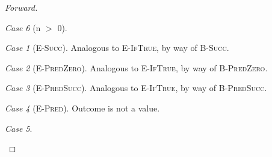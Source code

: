 \documentclass{article}
\theoremstyle{remark}
\newtheorem*{case}{Case}
\begin{document}
\begin{proof}[Forward]
\begin{case}[n $>$ 0]
            \begin{case}[\textsc{E-Succ}]
                Analogous to \textsc{E-IfTrue}, by way of \textsc{B-Succ}.
            \end{case}

            \begin{case}[\textsc{E-PredZero}]
                Analogous to \textsc{E-IfTrue}, by way of \textsc{B-PredZero}.
            \end{case}

            \begin{case}[\textsc{E-PredSucc}]
                Analogous to \textsc{E-IfTrue}, by way of \textsc{B-PredSucc}.
            \end{case}

            \begin{case}[\textsc{E-Pred}]
                Outcome is not a value.
            \end{case}

            \begin{case}

            \end{case}
        \end{case}


    \end{proof}
\end{document}
